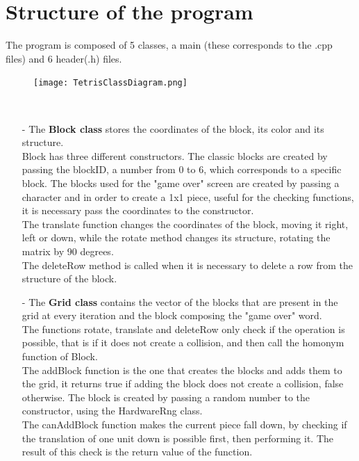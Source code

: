 \documentclass[18pt,oneside,a4paper, titlepage]{article}
\begin{document}
\section{Structure of the program}
	The program is composed of 5 classes, a main (these corresponds to the .cpp files) and 6 header(.h) files.\\
	\vspace{0.5cm}
	\begin{figure}[h]
		\centering
		\texttt{[image: TetrisClassDiagram.png]}
	\end{figure}
	\vspace{0.5cm}
	\\
	\begin{itemize}
		\item[-] The \textbf{Block class} stores the coordinates of the block, its color and its structure.\\
		Block has three different constructors. The classic blocks are created by passing the blockID, a number from 0 to 6, which corresponds to a specific block.
		The blocks used for the "game over" screen are created by passing a character and in order to create a 1x1 piece, useful for the checking functions, it is necessary pass the coordinates to the constructor.\\
		The translate function changes the coordinates of the block, moving it right, left or down, while the rotate method changes its structure, rotating the matrix by 90 degrees.\\
		The deleteRow method is called when it is necessary to delete a row from the structure of the block.\\
		\item[-] The \textbf{Grid class} contains the vector of the blocks that are present in the grid at every iteration and the block composing the "game over" word.\\
		The functions rotate, translate and deleteRow only check if the operation is possible, that is if it does not create a collision, and then call the homonym function of Block.\\
		The addBlock function is the one that creates the blocks and adds them to the grid, it returns true if adding the block does not create a collision, false otherwise. The block is created by passing a random number to the constructor, using the HardwareRng class.\\
		The canAddBlock function makes the current piece fall down, by checking if the translation of one unit down is possible first, then performing it. The result of this check is the return value of the function.\\

\end{itemize}
\end{document}
